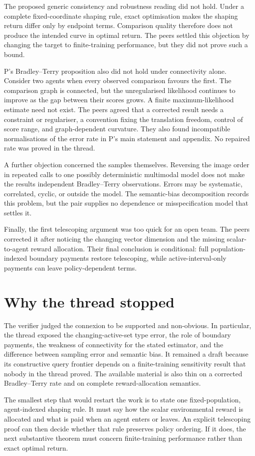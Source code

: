 \documentclass{article}
\begin{document}
The proposed generic consistency and robustness reading did not hold.  Under a complete fixed-coordinate shaping rule, exact optimisation makes the shaping return differ only by endpoint terms.  Comparison quality therefore does not produce the intended curve in optimal return.  The peers settled this objection by changing the target to finite-training performance, but they did not prove such a bound.

P's Bradley--Terry proposition also did not hold under connectivity alone.  Consider two agents when every observed comparison favours the first.  The comparison graph is connected, but the unregularised likelihood continues to improve as the gap between their scores grows.  A finite maximum-likelihood estimate need not exist.  The peers agreed that a corrected result needs a constraint or regulariser, a convention fixing the translation freedom, control of score range, and graph-dependent curvature.  They also found incompatible normalisations of the error rate in P's main statement and appendix.  No repaired rate was proved in the thread.

A further objection concerned the samples themselves.  Reversing the image order in repeated calls to one possibly deterministic multimodal model does not make the results independent Bradley--Terry observations.  Errors may be systematic, correlated, cyclic, or outside the model.  The semantic-bias decomposition records this problem, but the pair supplies no dependence or misspecification model that settles it.

Finally, the first telescoping argument was too quick for an open team.  The peers corrected it after noticing the changing vector dimension and the missing scalar-to-agent reward allocation.  Their final conclusion is conditional: full population-indexed boundary payments restore telescoping, while active-interval-only payments can leave policy-dependent terms.

\section{Why the thread stopped}

The verifier judged the connexion to be supported and non-obvious.  In particular, the thread exposed the changing-active-set type error, the role of boundary payments, the weakness of connectivity for the stated estimator, and the difference between sampling error and semantic bias.  It remained a draft because its constructive query frontier depends on a finite-training sensitivity result that nobody in the thread proved.  The available material is also thin on a corrected Bradley--Terry rate and on complete reward-allocation semantics.

The smallest step that would restart the work is to state one fixed-population, agent-indexed shaping rule.  It must say how the scalar environmental reward is allocated and what is paid when an agent enters or leaves.  An explicit telescoping proof can then decide whether that rule preserves policy ordering.  If it does, the next substantive theorem must concern finite-training performance rather than exact optimal return.



\end{document}
